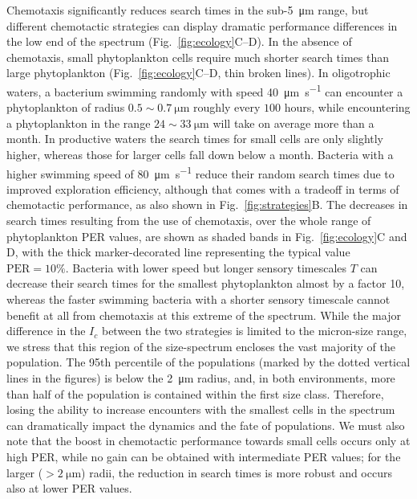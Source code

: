 \documentclass[9pt,twocolumn,twoside]{pnas-new}
\begin{document}
Chemotaxis significantly reduces search times in the sub-\SI{5}{\micro\m} range, but different chemotactic strategies can display dramatic performance differences in the low end of the spectrum (Fig.~\ref{fig:ecology}C--D).
In the absence of chemotaxis, small phytoplankton cells require much shorter search times than large phytoplankton (Fig.~\ref{fig:ecology}C--D, thin broken lines).
In oligotrophic waters, a bacterium swimming randomly with speed \SI{40}{\micro\m\per\s} can encounter a phytoplankton of radius $0.5\sim\SI{0.7}{\micro\m}$ roughly every $100$ hours, while encountering a phytoplankton in the range $24\sim\SI{33}{\micro\m}$ will take on average more than a month. 
%
In productive waters the search times for small cells are only slightly higher, whereas those for larger cells fall down below a month. Bacteria with a higher swimming speed of \SI{80}{\micro\m\per\s} reduce their random search times due to improved exploration efficiency, although that comes with a tradeoff in terms of chemotactic performance, as also shown in Fig.~\ref{fig:strategies}B.
The decreases in search times resulting from the use of chemotaxis, over the whole range of phytoplankton PER values, are shown as shaded bands in Fig.~\ref{fig:ecology}C and D, with the thick marker-decorated line representing the typical value $\mathrm{PER}=10\%$.
Bacteria with lower speed but longer sensory timescales $T$ can decrease their search times for the smallest phytoplankton almost by a factor 10, whereas the faster swimming bacteria with a shorter sensory timescale cannot benefit at all from chemotaxis at this extreme of the spectrum.
While the major difference in the $I_c$ between the two strategies is limited to the micron-size range, we stress that this region of the size-spectrum encloses the vast majority of the population.
The 95th percentile of the populations (marked by the dotted vertical lines in the figures) is below the \SI{2}{\micro\m} radius, and, in both environments, more than half of the population is contained within the first size class.
Therefore, losing the ability to increase encounters with the smallest cells in the spectrum can dramatically impact the dynamics and the fate of populations.
We must also note that the boost in chemotactic performance towards small cells occurs only at high PER, while no gain can be obtained with intermediate PER values; for the larger ($>\SI{2}{\micro\m}$) radii, the reduction in search times is more robust and occurs also at lower PER values.
\end{document}
